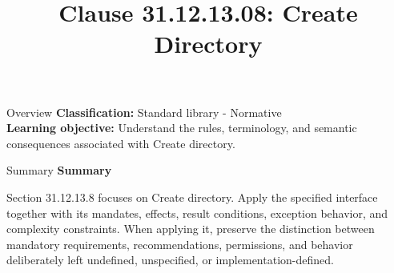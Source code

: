 \documentclass[10pt,letterpaper]{article}
\title{Clause 31.12.13.08: Create Directory}
\author{}
\date{}
\begin{document}
\maketitle
\begin{CornellOverviewBox}{Overview}
\textbf{Classification:} Standard library - Normative\\[2pt]
\textbf{Learning objective:} Understand the rules, terminology, and semantic consequences associated with Create directory.
\end{CornellOverviewBox}\begin{CornellSummaryBox}{Summary}
{\sffamily\bfseries\color{Accent} Summary}\par\vspace{3pt}Section 31.12.13.8 focuses on Create directory. Apply the specified interface together with its mandates, effects, result conditions, exception behavior, and complexity constraints. When applying it, preserve the distinction between mandatory requirements, recommendations, permissions, and behavior deliberately left undefined, unspecified, or implementation-defined.
\end{CornellSummaryBox}
\end{document}
